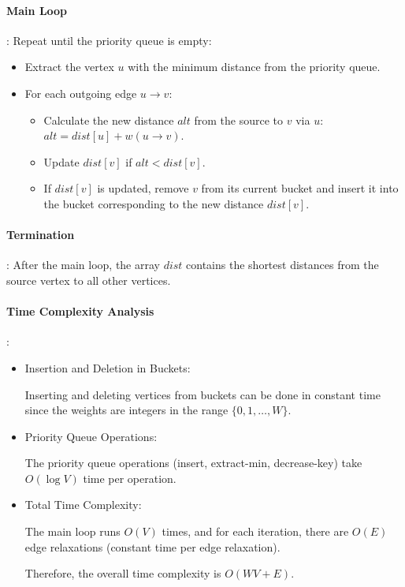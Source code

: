 \documentclass{article}
\begin{document}
\paragraph{Main Loop}:
  Repeat until the priority queue is empty:
  \begin{itemize}
    \item Extract the vertex \(u\) with the minimum distance from the priority queue.
    \item For each outgoing edge \(u \rightarrow v\):
    \begin{itemize}
      \item Calculate the new distance \(alt\) from the source to \(v\) via \(u\): \(alt = dist[u] + w(u \rightarrow v)\).
      \item Update \(dist[v]\) if \(alt < dist[v]\).
      \item If \(dist[v]\) is updated, remove \(v\) from its current bucket and insert it into the bucket corresponding to the new distance \(dist[v]\).
    \end{itemize}
  \end{itemize}

\paragraph{Termination}:
  After the main loop, the array \(dist\) contains the shortest distances from the source vertex to all other vertices.

\paragraph{Time Complexity Analysis}:

\begin{itemize}
  \item Insertion and Deletion in Buckets:
  
  Inserting and deleting vertices from buckets can be done in constant time since the weights are integers in the range \(\{0, 1, \ldots, W\}\).

  \item Priority Queue Operations:
  
  The priority queue operations (insert, extract-min, decrease-key) take \(O(\log V)\) time per operation.

  \item Total Time Complexity:
  
  The main loop runs \(O(V)\) times, and for each iteration, there are \(O(E)\) edge relaxations (constant time per edge relaxation).

  Therefore, the overall time complexity is \(O(WV + E)\).

\end{itemize}
\end{document}
